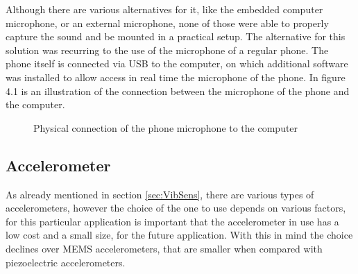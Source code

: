 Although there are various alternatives for it, like the embedded computer microphone, or an external microphone, none of those were able to properly capture the sound and be mounted in a practical setup. The alternative for this solution was recurring to the use of the microphone of a regular phone.  The phone itself is connected via USB to the computer, on which additional software was installed to allow access in real time the microphone of the phone.  In figure 4.1 is an illustration of the connection between the microphone of the phone and the computer.
\begin{figure}[]
    \centering
    \caption{Physical connection of the phone microphone to the computer}
    \label{fig:MicConnectio}
\end{figure}
\subsection{Accelerometer}
As already mentioned in section \ref{sec:VibSens}, there are various types of accelerometers, however the choice of the one to use depends on various factors, for this particular application is important that the accelerometer in use has a low cost and a small size, for the future application. With this in mind the choice declines over MEMS accelerometers, that are smaller when compared with piezoelectric accelerometers.

